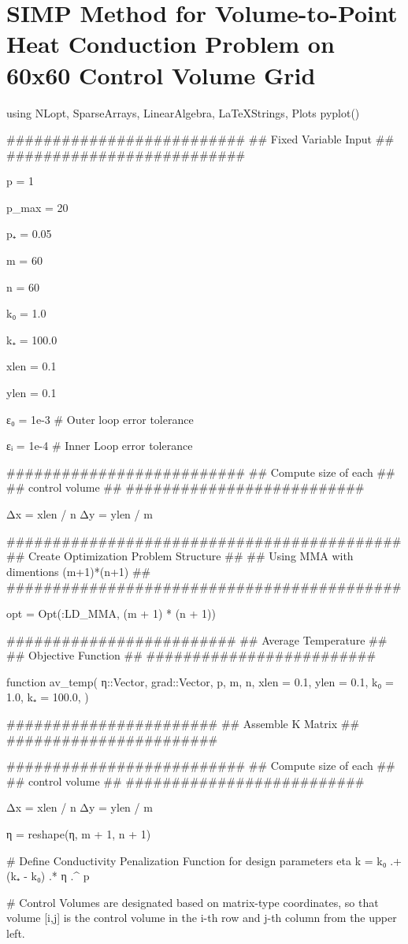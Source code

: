 \section{SIMP Method for Volume-to-Point Heat Conduction Problem on 60x60 Control Volume Grid}\label{sec:SIMP-Alg}
\begin{jllisting}
using NLopt, SparseArrays, LinearAlgebra, LaTeXStrings, Plots
pyplot()

##########################
## Fixed Variable Input ##
##########################

p = 1

p_max = 20

p₊ = 0.05

m = 60

n = 60

k₀ = 1.0

k₊ = 100.0

xlen = 0.1

ylen = 0.1

ε₀ = 1e-3 # Outer loop error tolerance

εᵢ = 1e-4 # Inner Loop error tolerance

##########################
## Compute size of each ##
##   control volume     ##
##########################

Δx = xlen / n
Δy = ylen / m

###########################################
## Create Optimization Problem Structure ##
## Using MMA with dimentions (m+1)*(n+1) ##
###########################################

opt = Opt(:LD_MMA, (m + 1) * (n + 1))

#########################
## Average Temperature ##
## Objective Function  ##
#########################

function av_temp(
	η::Vector,
	grad::Vector,
	p,
	m,
	n,
	xlen = 0.1,
	ylen = 0.1,
	k₀ = 1.0,
	k₊ = 100.0,
)

	#######################
	## Assemble K Matrix ##
	#######################

	##########################
	## Compute size of each ##
	##   control volume     ##
	##########################

	Δx = xlen / n
	Δy = ylen / m

	η = reshape(η, m + 1, n + 1)

	# Define Conductivity Penalization Function for design parameters eta
	k = k₀ .+ (k₊ - k₀) .* η .^ p

	# Control Volumes are designated based on matrix-type coordinates, so that volume [i,j] is the control volume in the i-th row and j-th column from the upper left.


\end{jllisting}
